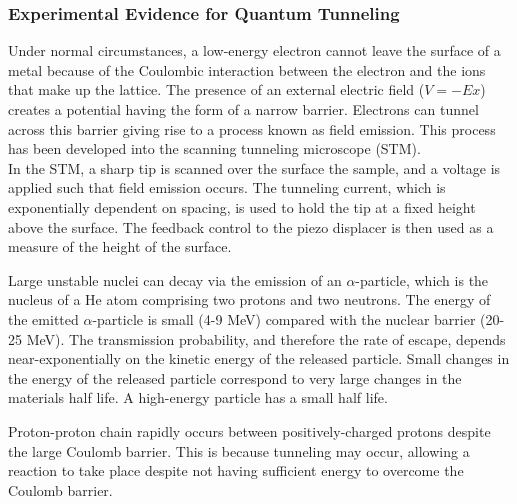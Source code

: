 \documentclass[a4paper]{article}
\begin{document}
\subsubsection*{Experimental Evidence for Quantum Tunneling}
\begin{eg}
Under normal circumstances, a low-energy electron cannot leave the surface of a metal because of the Coulombic interaction between the electron and the ions that make up the lattice.
The presence of an external electric field ($V =-Ex$) creates a potential having the form of a narrow barrier. Electrons can tunnel across this barrier giving rise to a process known as field emission. This process has been developed into the scanning tunneling microscope (STM).\\[5pt]
In the STM, a sharp tip is scanned over the surface the sample, and a voltage is applied such that field emission occurs. The tunneling current, which is exponentially dependent on spacing, is used to hold the tip at a fixed height above the surface. The feedback control to the piezo displacer is then used as a measure of the height of the surface.
\end{eg}
\begin{eg}
Large unstable nuclei can decay via the emission of an $\alpha$-particle, which is the nucleus of a He atom comprising two protons and two neutrons. The energy of the emitted $\alpha$-particle is small (4-9 MeV) compared with the nuclear barrier (20-25 MeV). The transmission probability, and therefore the rate of escape, depends near-exponentially on the kinetic energy of the released particle. Small changes in the energy of the released particle correspond to very large changes in the materials half life. A high-energy particle has a small half life.
\end{eg}
\begin{eg}
Proton-proton chain rapidly occurs between positively-charged protons despite the large Coulomb barrier. This is because tunneling may occur, allowing a reaction to take place despite not having sufficient energy to overcome the Coulomb barrier.
\end{eg}
\end{document}
